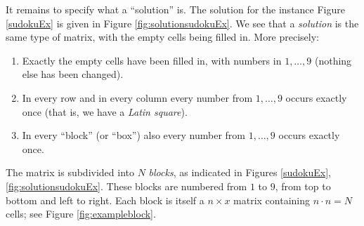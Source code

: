 \documentclass[11pt]{report}
\begin{document}
It remains to specify what a ``solution'' is. The solution for the instance Figure \ref{sudokuEx} is given in Figure \ref{fig:solutionsudokuEx}. We see that a \textit{solution} is the same type of matrix, with the empty cells being filled in. More precisely:
\begin{enumerate}
\item Exactly the empty cells have been filled in, with numbers in $1,\dots,9$ (nothing else has been changed).
\item In every row and in every column every number from $1,\dots,9$ occurs exactly once (that is, we have a \emph{Latin square}).
\item In every ``block'' (or ``box'') also every number from $1,\dots,9$ occurs exactly once.
\end{enumerate}

The matrix is subdivided into $N$ \textit{blocks}, as indicated in Figures \ref{sudokuEx}, \ref{fig:solutionsudokuEx}. These blocks are numbered from $1$ to $9$, from top to bottom and left to right. Each block is itself a $n \times x$ matrix containing $n \cdot n = N$ cells; see Figure \ref{fig:exampleblock}.
\end{document}
